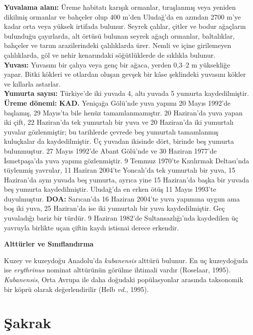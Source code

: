 \documentclass[
  10.5pt,
  a4paper,
  DIV=11,
  numbers=noendperiod,
  twocolumn]{scrreprt}
\begin{document}
\textbf{Yuvalama alanı:} Üreme habitatı karışık ormanlar, tıraşlanmış
veya yeniden dikilmiş ormanlar ve bahçeler olup 400 m'den Uludağ'da en
azından 2700 m'ye kadar orta veya yüksek irtifada bulunur. Seyrek
çalılar, çitler ve bodur ağaçların bulunduğu çayırlarda, alt örtüsü
bulunan seyrek ağaçlı ormanlar, baltalıklar, bahçeler ve tarım
arazilerindeki çalılıklarda ürer. Nemli ve içine girilemeyen
çalılıklarda, göl ve nehir kenarındaki söğütlüklerde de sıklıkla
bulunur.\\
\textbf{Yuvası:} Yuvasını bir çalıya veya genç bir ağaca, yerden 0,3--2
m yüksekliğe yapar. Bitki kökleri ve otlardan oluşan gevşek bir kâse
şeklindeki yuvasını kökler ve kıllarla astarlar.\\
\textbf{Yumurta sayısı:} Türkiye'de iki yuvada 4, altı yuvada 5 yumurta
kaydedilmiştir.\\
\textbf{Üreme dönemi:} \textbf{KAD.} Yeniçağa Gölü'nde yuva yapımı 20
Mayıs 1992'de başlamış, 29 Mayıs'ta bile henüz tamamlanmamıştır. 20
Haziran'da yuva yapan iki çift, 22 Haziran'da tek yumurtalı bir yuva ve
20 Haziran'da iki yumurtalı yuvalar gözlenmiştir; bu tarihlerde çevrede
beş yumurtalı tamamlanmış kuluçkalar da kaydedilmiştir. Üç yuvadan
ikisinde dört, birinde beş yumurta bulunmuştur. 27 Mayıs 1992'de Abant
Gölü'nde ve 30 Haziran 1977'de İsmetpaşa'da yuva yapımı gözlenmiştir. 9
Temmuz 1970'te Kızılırmak Deltası'nda tüylenmiş yavrular, 11 Haziran
2004'te Yoncalı'da tek yumurtalı bir yuva, 15 Haziran'da aynı yuvada beş
yumurta, ayrıca yine 15 Haziran'da başka bir yuvada beş yumurta
kaydedilmiştir. Uludağ'da en erken ötüş 11 Mayıs 1993'te duyulmuştur.
\textbf{DOA:} Sarıcan'da 16 Haziran 2004'te yuva yapımına uygun ama boş
iki yuva, 25 Haziran'da ise iki yumurtalı bir yuva kaydedilmiştir. Geç
yuvaladığı bariz bir türdür. 9 Haziran 1982'de Sultansazlığı'nda
kaydedilen üç yavruyla birlikte uçan çiftin kaydı istisnai derece
erkendir.

\textbf{Alttürler ve Sınıflandırma}

Kuzey ve kuzeydoğu Anadolu'da \emph{kubanensis} alttürü bulunur. En uç
kuzeydoğuda ise \emph{erythrinus} nominat alttürünün görülme ihtimali
vardır (Roselaar, 1995). \emph{Kubanensis}, Orta Avrupa ile daha
doğudaki popülasyonlar arasında taksonomik bir köprü olarak
değerlendirilir (Helb \emph{vd.}, 1995).

\section{Şakrak}\label{ux15fakrak}
\end{document}

